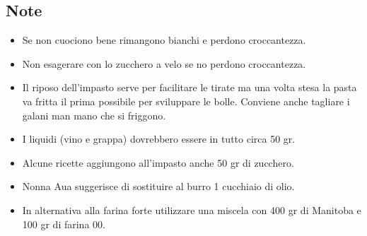 \subsection{Note}
\begin{itemize}
\item Se non cuociono bene rimangono bianchi e perdono croccantezza.  
\item Non esagerare con lo zucchero a velo se no perdono croccantezza.  
\item Il riposo dell'impasto serve per facilitare le tirate ma una volta stesa la pasta va fritta il prima possibile per sviluppare le bolle. Conviene anche tagliare i galani man mano che si friggono.  
\item I liquidi (vino e grappa) dovrebbero essere in tutto circa 50 gr.  
\item Alcune ricette aggiungono all'impasto anche 50 gr di zucchero.  
\item Nonna Aua suggerisce di sostituire al burro 1 cucchiaio di olio.  
\item In alternativa alla farina forte utilizzare una miscela con 400 gr di Manitoba e 100 gr di farina 00.
\end{itemize}

